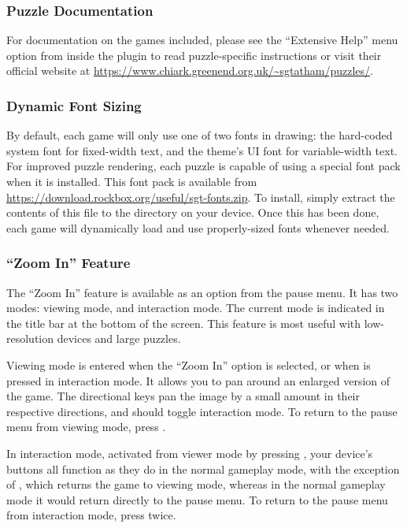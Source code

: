 \subsubsection{Puzzle Documentation}
For documentation on the games included, please see the ``Extensive
Help'' menu option from inside the plugin to read puzzle-specific
instructions or visit their official website at
\url{https://www.chiark.greenend.org.uk/~sgtatham/puzzles/}.

\subsubsection{Dynamic Font Sizing}
By default, each game will only use one of two fonts in drawing: the
hard-coded system font for fixed-width text, and the theme's UI font
for variable-width text. For improved puzzle rendering, each puzzle is
capable of using a special font pack when it is installed. This font
pack is available from
\url{https://download.rockbox.org/useful/sgt-fonts.zip}. To install,
simply extract the contents of this file to the
 directory on your device. Once this has been
done, each game will dynamically load and use properly-sized fonts
whenever needed.


\subsubsection{``Zoom In'' Feature}
The ``Zoom In'' feature is available as an option from the pause
menu. It has two modes: viewing mode, and interaction mode. The
current mode is indicated in the title bar at the bottom of the
screen. This feature is most useful with low-resolution devices and
large puzzles.

Viewing mode is entered when the ``Zoom In'' option is selected, or
when {\PluginCancel} is pressed in interaction mode. It allows you to
pan around an enlarged version of the game. The directional keys pan
the image by a small amount in their respective directions, and
{\PluginSelect} should toggle interaction mode. To return to the pause
menu from viewing mode, press {\PluginCancel}.

In interaction mode, activated from viewer mode by pressing
{\PluginSelect}, your device's buttons all function as they do in the
normal gameplay mode, with the exception of {\PluginCancel}, which
returns the game to viewing mode, whereas in the normal gameplay mode
it would return directly to the pause menu. To return to the pause
menu from interaction mode, press {\PluginCancel} twice.

